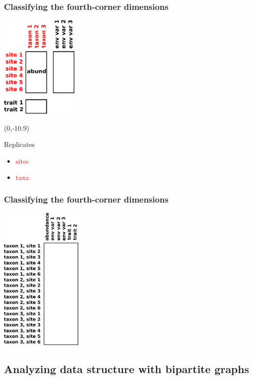 \documentclass{beamer}
\numberwithin{exercise}{section}
\begin{document}
\begin{frame}
\frametitle{Classifying the fourth-corner dimensions}
\begin{center}
\includegraphics[width=3.8cm]{forthcornerREPLICATES}
\begin{textblock}{4}(0,-10.9)
\begin{block}{Replicates}
\begin{itemize}
\item \textcolor{red}{sites}
\item \textcolor{red}{taxa}
\end{itemize}
\end{block}
\end{textblock}
\end{center}
\end{frame}

\begin{frame}
\frametitle{Classifying the fourth-corner dimensions}
\begin{center}
\includegraphics[width=4cm]{forthcorner2dataframeREPEAT}
\end{center}
\end{frame}

\subsection[Bipartite graphs]{Analyzing data structure with bipartite graphs}
\end{document}
